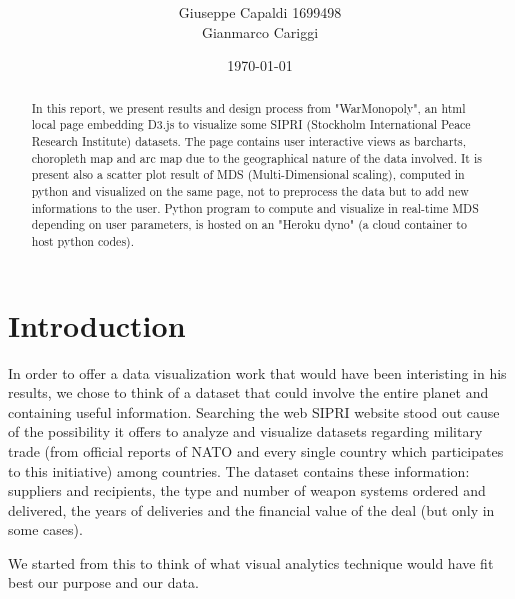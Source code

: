 \documentclass[twocolumn]{article}
\title{\spacecaps{WarMonopoly}\\ \normalsize \spacesc{Visual Analytics Course Sapienza University of Rome} }
\author{Giuseppe Capaldi 1699498\\ Gianmarco Cariggi}
\date{\today}
\begin{document}
\maketitle

\begin{abstract}
%

In this report, we present results and design process from "WarMonopoly", an html local page embedding D3.js to visualize some SIPRI (Stockholm International Peace Research Institute) datasets. The page contains user interactive views as barcharts, choropleth map and arc map due to the geographical nature of the data involved. It is present also a scatter plot result of MDS (Multi-Dimensional scaling), computed in python and visualized on the same page, not to preprocess the data but to add new informations to the user. Python program to compute and visualize in real-time MDS depending on user parameters, is hosted on an "Heroku dyno" (a cloud container to host python codes).


%
\end{abstract}


\section{Introduction}
%
In order to offer a data visualization work that would have been interisting in his results, we chose to think of a dataset that could involve the entire planet and containing useful information. Searching the web SIPRI website stood out cause of the possibility it offers to analyze and visualize datasets regarding military trade (from official reports of NATO and every single country which participates to this initiative) among countries. The dataset contains these information: suppliers and recipients, the type and number of weapon systems ordered and delivered, the years of deliveries and the financial value of the deal (but only in some cases). 


We started from this to think of what visual analytics technique would have fit best our purpose and our data.
\end{document}
